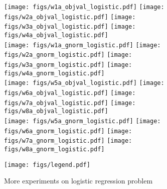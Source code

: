 \begin{figure}

\centering
\texttt{[image: figs/w1a\_objval\_logistic.pdf]}
\texttt{[image: figs/w2a\_objval\_logistic.pdf]}
\texttt{[image: figs/w3a\_objval\_logistic.pdf]}
\texttt{[image: figs/w4a\_objval\_logistic.pdf]}
\\
\texttt{[image: figs/w1a\_gnorm\_logistic.pdf]}
\texttt{[image: figs/w2a\_gnorm\_logistic.pdf]}
\texttt{[image: figs/w3a\_gnorm\_logistic.pdf]}
\texttt{[image: figs/w4a\_gnorm\_logistic.pdf]}
\\
\texttt{[image: figs/w5a\_objval\_logistic.pdf]}
\texttt{[image: figs/w6a\_objval\_logistic.pdf]}
\texttt{[image: figs/w7a\_objval\_logistic.pdf]}
\texttt{[image: figs/w8a\_objval\_logistic.pdf]}
\\
\texttt{[image: figs/w5a\_gnorm\_logistic.pdf]}
\texttt{[image: figs/w6a\_gnorm\_logistic.pdf]}
\texttt{[image: figs/w7a\_gnorm\_logistic.pdf]}
\texttt{[image: figs/w8a\_gnorm\_logistic.pdf]}
	
\texttt{[image: figs/legend.pdf]}
\caption{More experiments on logistic regression problem}
\label{fig:log-add-2}
\end{figure}
